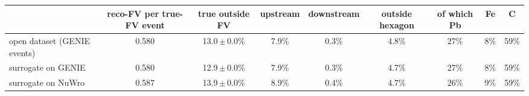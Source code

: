 \begin{tabular}{lcccccccc}
\toprule
 & reco-FV per true-FV event & true outside FV & upstream & downstream & outside hexagon & of which Pb & Fe & C \\
\midrule
open dataset (GENIE events) & 0.580 & 13.0\,$\pm$\,0.0\% & 7.9\% & 0.3\% & 4.8\% & 27\% & 8\% & 59\% \\
surrogate on GENIE & 0.580 & 12.9\,$\pm$\,0.0\% & 7.9\% & 0.3\% & 4.7\% & 27\% & 8\% & 59\% \\
surrogate on NuWro & 0.587 & 13.9\,$\pm$\,0.0\% & 8.9\% & 0.4\% & 4.7\% & 26\% & 9\% & 59\% \\
\bottomrule
\end{tabular}
